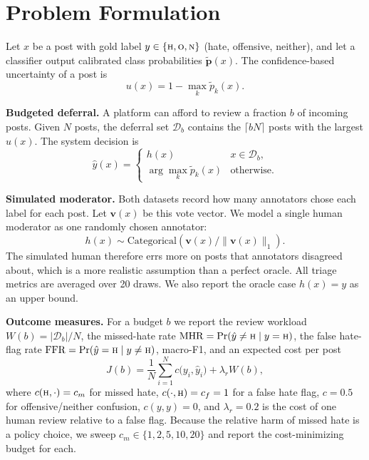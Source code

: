 \documentclass[lettersize,journal]{IEEEtran}
\begin{document}
\section{Problem Formulation}\label{sec:formulation}
Let $x$ be a post with gold label $y \in \{\textsc{h},\textsc{o},\textsc{n}\}$ (hate, offensive, neither), and let a classifier output calibrated class probabilities $\tilde{\mathbf{p}}(x)$. The confidence-based uncertainty of a post is
\begin{equation}
u(x) = 1 - \max_k \tilde{p}_k(x).
\end{equation}

\textbf{Budgeted deferral.} A platform can afford to review a fraction $b$ of incoming posts. Given $N$ posts, the deferral set $\mathcal{D}_b$ contains the $\lceil bN \rceil$ posts with the largest $u(x)$. The system decision is
\begin{equation}
\hat{y}(x) =
\begin{cases}
h(x) & x \in \mathcal{D}_b,\\
\arg\max_k \tilde{p}_k(x) & \text{otherwise.}
\end{cases}
\end{equation}

\textbf{Simulated moderator.} Both datasets record how many annotators chose each label for each post. Let $\mathbf{v}(x)$ be this vote vector. We model a single human moderator as one randomly chosen annotator:
\begin{equation}
h(x) \sim \mathrm{Categorical}\!\left(\mathbf{v}(x)/\lVert \mathbf{v}(x)\rVert_1\right).
\end{equation}
The simulated human therefore errs more on posts that annotators disagreed about, which is a more realistic assumption than a perfect oracle. All triage metrics are averaged over 20 draws. We also report the oracle case $h(x)=y$ as an upper bound.

\textbf{Outcome measures.} For a budget $b$ we report the review workload $W(b)=|\mathcal{D}_b|/N$, the missed-hate rate $\mathrm{MHR}=\Pr(\hat{y}\neq\textsc{h}\mid y=\textsc{h})$, the false hate-flag rate $\mathrm{FFR}=\Pr(\hat{y}=\textsc{h}\mid y\neq\textsc{h})$, macro-F1, and an expected cost per post
\begin{equation}
J(b) = \frac{1}{N}\sum_{i=1}^{N} c\bigl(y_i,\hat{y}_i\bigr) + \lambda_r W(b),
\end{equation}
where $c(\textsc{h},\cdot)=c_m$ for missed hate, $c(\cdot,\textsc{h})=c_f=1$ for a false hate flag, $c=0.5$ for offensive/neither confusion, $c(y,y)=0$, and $\lambda_r=0.2$ is the cost of one human review relative to a false flag. Because the relative harm of missed hate is a policy choice, we sweep $c_m \in \{1,2,5,10,20\}$ and report the cost-minimizing budget for each.
\end{document}

